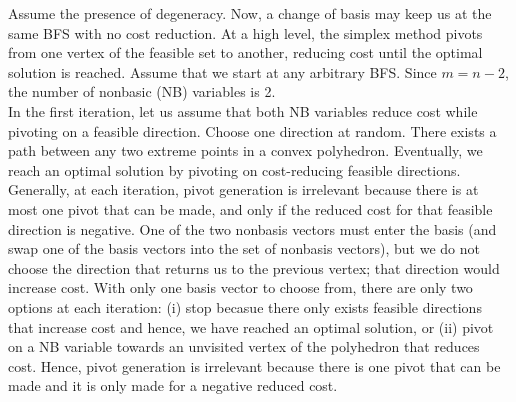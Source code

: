 \documentclass{article}
\begin{document}
\noindent
Assume the presence of degeneracy.  Now, a change of basis may keep us at the same BFS with no cost reduction.  At a high level, the simplex method pivots from one vertex of the feasible set to another, reducing cost until the optimal solution is reached.  Assume that we start at any arbitrary BFS.  Since $m = n-2$, the number of nonbasic (NB) variables is 2.\\

\noindent
In the first iteration, let us assume that both NB variables reduce cost while pivoting on a feasible direction.  Choose one direction at random.  There exists a path between any two extreme points in a convex polyhedron.  Eventually, we reach an optimal solution by pivoting on cost-reducing feasible directions.  \\

\noindent
Generally, at each iteration, pivot generation is irrelevant because there is at most one pivot that can be made, and only if the reduced cost for that feasible direction is negative.  One of the two nonbasis vectors must enter the basis (and swap one of the basis vectors into the set of nonbasis vectors), but we do not choose the direction that returns us to the previous vertex;  that direction would increase cost.  With only one basis vector to choose from, there are only two options at each iteration:  (i) stop becasue there only exists feasible directions that increase cost and hence, we have reached an optimal solution, or (ii) pivot on a NB variable towards an unvisited vertex of the polyhedron that reduces cost. Hence, pivot generation is irrelevant because there is one pivot that can be made and it is only made for a negative reduced cost.  \\
\end{document}
